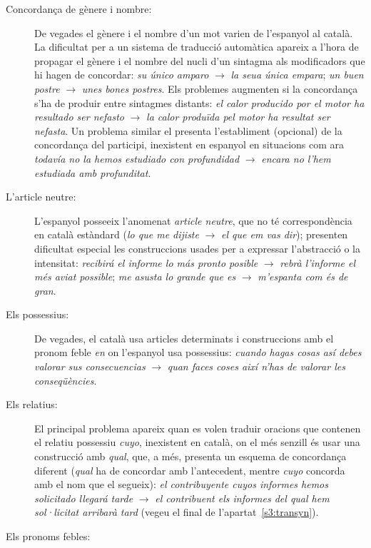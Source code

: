 \begin{description}
\item[Concordança de gènere i nombre:] De vegades el gènere i el
  nombre d'un mot varien de l'espanyol al català. La dificultat per a
  un sistema de traducció automàtica apareix a l'hora de propagar el
  gènere i el nombre del nucli d'un sintagma als modificadors que hi
  hagen de concordar: \emph{su único amparo} $\rightarrow$ \emph{la
    seua única empara}; \emph{un buen postre} $\rightarrow$ \emph{unes
    bones postres}. Els problemes augmenten si la concordança s'ha
  de produir entre sintagmes distants: \emph{el calor producido por el
    motor ha resultado ser nefasto} $\rightarrow$ \emph{la calor
    produïda pel motor ha resultat ser nefasta}. Un problema similar
  el presenta l'establiment (opcional) de la concordança del
  participi, inexistent en espanyol en situacions com ara
  \emph{todavía no la hemos estudiado con profundidad} $\rightarrow$
  \emph{encara no l'hem estudiada amb profunditat}.
\item[L'article neutre:] L'espanyol posseeix l'anomenat {\em
    article neutre}, que no té correspondència en  català estàndard
  (\emph{lo que me dijiste} $\rightarrow$ \emph{el que em vas dir});
  presenten dificultat especial les construccions usades per a
  expressar l'abstracció o la intensitat: 
  \emph{recibirá el informe lo más pronto posible}
  $\rightarrow$ \emph{rebrà l'informe el més aviat possible};
  \emph{me asusta lo grande que es} $\rightarrow$ \emph{m'espanta com
    és de gran}.
\item[Els possessius:] De vegades, el català usa articles
  determinats i construccions amb el pronom feble \emph{en} 
  on l'espanyol usa possessius: \emph{cuando hagas cosas así
    debes valorar sus consecuencias} $\rightarrow$ \emph{quan
    faces coses així n'has de valorar les
    conseqüències}. 
\item[Els relatius:]
El principal problema apareix quan es volen traduir oracions que
contenen 
el relatiu possessiu \emph{cuyo},
inexistent en català, on el més senzill és 
usar una construcció amb {\em
  qual}, que, a més, presenta un esquema de concordança
diferent (\emph{qual} ha de concordar amb l'antecedent, mentre {\em
  cuyo} concorda amb el nom que el segueix):
\emph{el contribuyente cuyos informes hemos solicitado llegará tarde} 
$\rightarrow$ \emph{el contribuent els informes del qual hem
  sol·licitat 
arribarà tard} (vegeu el final de l'apartat~\ref{s3:transyn}).
\item[Els pronoms febles:]

\end{description}
